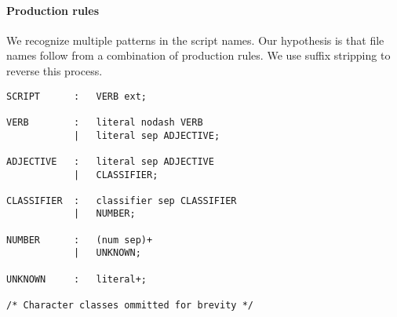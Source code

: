 \paragraph{Production rules}
We recognize multiple patterns in the script names. Our hypothesis is that file names follow from a combination of production rules. We use suffix stripping to reverse this process.

\begin{verbatim}
SCRIPT      :   VERB ext;

VERB        :   literal nodash VERB
            |   literal sep ADJECTIVE;

ADJECTIVE   :   literal sep ADJECTIVE
            |   CLASSIFIER;

CLASSIFIER  :   classifier sep CLASSIFIER
            |   NUMBER;

NUMBER      :   (num sep)+
            |   UNKNOWN;

UNKNOWN     :   literal+;

/* Character classes ommitted for brevity */
\end{verbatim}
